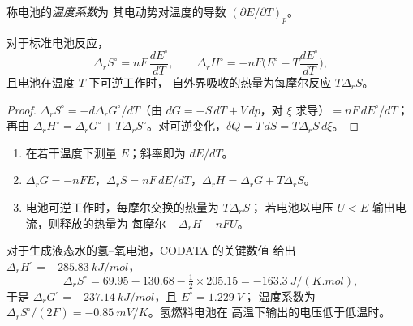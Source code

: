 \begin{definition}[温度系数]\label{def:b2:cell-thermodynamics:temperature-coefficient}
称电池的\emph{温度系数}为
其电动势对温度的导数
$(\partial E/\partial T)_p$。
\end{definition}

\begin{proposition}[由电池数据求熵与焓]\label{prop:b2:cell-thermodynamics:entropy}
对于标准电池反应，
\[
  \Delta_r S^\circ = nF\,\frac{dE^\circ}{dT}, \qquad
  \Delta_r H^\circ = -nF\Big(E^\circ - T\frac{dE^\circ}{dT}\Big),
\]
且电池在温度 $T$ 下可逆工作时，
自外界吸收的热量为每摩尔反应 $T\Delta_r S$。
\end{proposition}

\begin{proof}
$\Delta_r S^\circ = -d\Delta_r G^\circ/dT$（由 $dG = -S\,dT + V\,dp$，对
$\xi$ 求导）$= nF\,dE^\circ/dT$；再由 $\Delta_r H^\circ = \Delta_r G^\circ
+ T\Delta_r S^\circ$。对可逆变化，$\delta Q = T\,dS = T\Delta_r S\,
d\xi$。
\end{proof}

\begin{method}[由电池数据求反应的热力学量]\label{met:b2:cell-thermodynamics:cell-data}
\begin{enumerate}
  \item 在若干温度下测量 $E$；斜率即为 $dE/dT$。
  \item $\Delta_r G = -nFE$，$\Delta_r S = nF\,dE/dT$，$\Delta_r H = \Delta_r G +
        T\Delta_r S$。
  \item 电池可逆工作时，每摩尔交换的热量为 $T\Delta_r S$；
        若电池以电压 $U < E$ 输出电流，则释放的热量为
        每摩尔 $-\Delta_r H - nFU$。
\end{enumerate}
\end{method}

对于生成液态水的氢–氧电池，CODATA 的关键数值
给出 $\Delta_r H^\circ = \qty{-285.83}{kJ/mol}$，
\[
  \Delta_r S^\circ = 69.95 - 130.68 - \tfrac12 \times 205.15 = \qty{-163.3}{J/(K.mol)} ,
\]
于是 $\Delta_r G^\circ = \qty{-237.14}{kJ/mol}$，且 $E^\circ = \qty{1.229}{V}$；
温度系数为 $\Delta_r S^\circ/(2F) = \qty{-0.85}{mV/K}$。氢燃料电池在
高温下输出的电压低于低温时。

